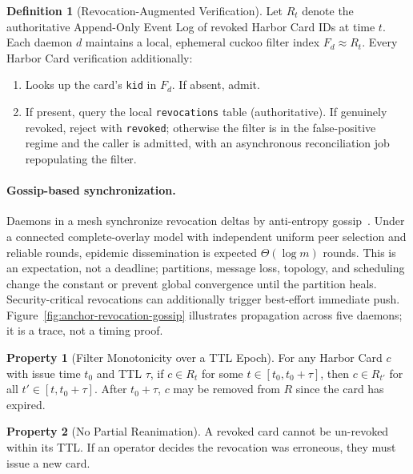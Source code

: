 \documentclass[11pt,a4paper]{article}
\theoremstyle{definition}
\newtheorem{definition}{Definition}[section]
\newtheorem{property}{Property}[section]
\begin{document}
\begin{definition}[Revocation-Augmented Verification]\label{def:revocation}
Let $R_t$ denote the authoritative Append-Only Event Log of revoked Harbor Card IDs at time $t$. Each daemon $d$ maintains a local, ephemeral cuckoo filter index $F_d \approx R_t$. Every Harbor Card verification additionally:
\begin{enumerate}[nosep]
  \item Looks up the card's \texttt{kid} in $F_d$. If absent, admit.
  \item If present, query the local \texttt{revocations} table (authoritative). If genuinely revoked, reject with \texttt{revoked}; otherwise the filter is in the false-positive regime and the caller is admitted, with an asynchronous reconciliation job repopulating the filter.
\end{enumerate}
\end{definition}

\paragraph{Gossip-based synchronization.} Daemons in a mesh synchronize revocation deltas by anti-entropy gossip~\cite{demers1987epidemic}. Under a connected complete-overlay model with independent uniform peer selection and reliable rounds, epidemic dissemination is expected $\Theta(\log m)$ rounds. This is an expectation, not a deadline; partitions, message loss, topology, and scheduling change the constant or prevent global convergence until the partition heals. Security-critical revocations can additionally trigger best-effort immediate push. Figure~\ref{fig:anchor-revocation-gossip} illustrates propagation across five daemons; it is a trace, not a timing proof.



\begin{property}[Filter Monotonicity over a TTL Epoch]\label{prop:filter-mono}
For any Harbor Card $c$ with issue time $t_0$ and TTL $\tau$, if $c \in R_t$ for some $t \in [t_0, t_0+\tau]$, then $c \in R_{t'}$ for all $t' \in [t, t_0+\tau]$. After $t_0+\tau$, $c$ may be removed from $R$ since the card has expired.
\end{property}

\begin{property}[No Partial Reanimation]\label{prop:no-reanim}
A revoked card cannot be un-revoked within its TTL. If an operator decides the revocation was erroneous, they must issue a new card.
\end{property}
\end{document}
